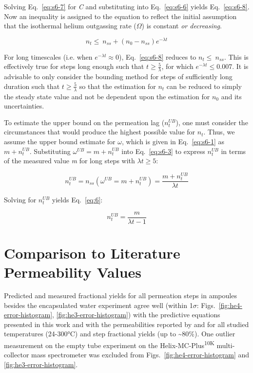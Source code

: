 Solving Eq.~\eqref{eq:s6-7} for \emph{C} and substituting into Eq.~\eqref{eq:s6-6} yields
Eq.~\eqref{eq:s6-8}. Now an inequality is assigned to the equation to reflect the
initial assumption that the isothermal helium outgassing rate
(\(\Omega\)) is constant \emph{or decreasing}.

\begin{equation}
n_{t} \leq \ n_{ss} + \left( n_{0} - n_{ss} \right)e^{- \lambda t}
\label{eq:s6-8}
\end{equation}

For long timescales (i.e. when \(e^{- \lambda t} \approx 0\)), Eq.~\eqref{eq:s6-8}
reduces to \(n_{t} \leq \ n_{ss}\). This is effectively true for steps
long enough such that \(t \geq \frac{5}{\lambda}\), for which
\(e^{- \lambda t} \leq 0.007.\) It is advisable to only consider the
bounding method for steps of sufficiently long duration such that
\(t \geq \frac{5}{\lambda}\) so that the estimation for \(n_{t}\) can be
reduced to simply the steady state value and not be dependent upon the
estimation for \(n_{0}\) and its uncertainties. 

To estimate the upper bound on the permeation lag (\(n_{t}^{UB}\)), one
must consider the circumstances that would produce the highest possible
value for \(n_{t}\). Thus, we assume the upper bound estimate for $\omega$, which is
given in Eq.~\eqref{eq:s6-1} as \({m + n}_{t}^{UB}\).  Substituting
\(\omega^{UB} = {m + n}_{t}^{UB}\) into Eq.~\eqref{eq:s6-3} to express
\(n_{t}^{UB}\) in terms of the measured value \emph{m} for long steps with $\lambda t \geq 5$:

\[
n_{t}^{UB} = n_{ss}(\omega^{UB} = m + n_{t}^{UB}) = \frac{m + n_{t}^{UB}}{\lambda t}
\]

Solving for \(n_{t}^{UB}\) yields Eq.~\eqref{eq:6}:

\begin{equation}
n_{t}^{UB} = \frac{m}{\lambda t - 1}
\label{eq:6}
\end{equation}

\section{Comparison to Literature Permeability Values}\label{comparison-to-literature-permeability-values}

Predicted and measured fractional yields for all permeation steps in ampoules besides the encapsulated water experiment agree well (within 1$\sigma$: Figs.~\ref{fig:he4-error-histogram}, \ref{fig:he3-error-histogram}) with the predictive equations presented in this work and with the permeabilities reported by \citet{swets1961} and \citet{jones1953} for all studied temperatures (24-300°C) and step fractional yields (up to \textasciitilde80\%). One outlier measurement on the empty tube experiment on the Helix-MC-Plus\textsuperscript{10K} multi-collector mass spectrometer was excluded from Figs.~\ref{fig:he4-error-histogram} and \ref{fig:he3-error-histogram}.


